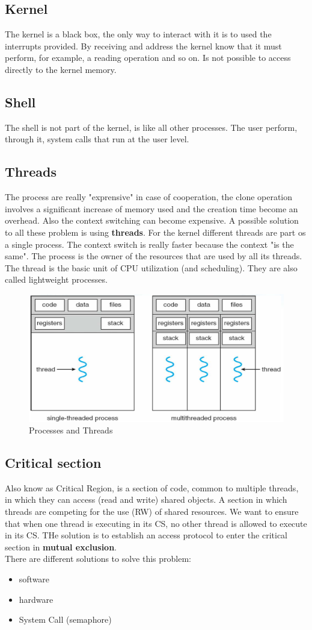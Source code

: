 \documentclass[12pt]{article}
\begin{document}
\subsection{Kernel}
The kernel is a black box, the only way to interact with it is to used the interrupts provided. By receiving and address the kernel know that it must perform, for example, a reading operation and so on. Is not possible to access directly to the kernel memory.

\subsection{Shell}
The shell is not part of the kernel, is like all other processes. The user perform, through it, system calls that run at the user level.

\subsection{Threads}
The process are really "exprensive" in case of cooperation, the clone operation involves a significant increase of memory used and the creation time become an overhead. Also the context switching can become expensive. A possible solution to all these problem is using \textbf{threads}. For the kernel different threads are part os a single process. The context switch is really faster because the context "is the same". The process is the owner of the resources that are used by all its threads. The thread is the basic unit of CPU utilization (and scheduling). They are also called lightweight processes.
\begin{figure}[H]
  \centering
  \includegraphics[width=0.5\linewidth]{images/proc_thread.png}
  \caption{Processes and Threads}
  \label{fig:proc_thread}
\end{figure}

\subsection{Critical section}
Also know as Critical Region, is a section of code, common to multiple threads, in which they can access (read and write) shared objects. A section in which threads are competing for the use (R\/W) of shared resources. We want to ensure that when one thread is executing in its CS, no other thread is allowed to execute in its CS. THe solution is to establish an access protocol to enter the critical section in \textbf{mutual exclusion}.\\
There are different solutions to solve this problem:
\begin{itemize}
  \item software
  \item hardware
  \item System Call (semaphore)
\end{itemize}
\end{document}
